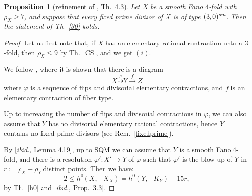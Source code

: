 \documentclass[a4paper,12pt]{amsart}
\newtheorem{proposition}[thm]{Proposition}
\theoremstyle{definition}
\numberwithin{figure}{section}
\numberwithin{table}{section}
\newcommand{\ph}{\varphi}
\newcommand{\la}{\longrightarrow}
\newcommand{\sm}{\text{\it sm}}
\begin{document}
\begin{proposition}[refinement of \cite{blowup}, Th.~4.3]\label{all30}
  Let $X$ be a smooth Fano $4$-fold with $\rho_X\geq 7$, and suppose that every fixed prime divisor of $X$ is of type $(3,0)^{\sm}$. Then the statement of Th.~\ref{30} holds.
  \end{proposition}
  \begin{proof}
    Let us first note that, if $X$ has an elementary rational contraction onto a $3$-fold, then $\rho_X\leq 9$ by Th.~\ref{CS}, and we get $(i)$.

    We follow  \cite[proof of Lemma 4.22]{blowup}, where it is shown that there is a diagram
    $$X\stackrel{\ph}{\dasharrow} Y\stackrel{f}{\la} Z$$
    where $\ph$ is a sequence of flips and divisorial elementary  contractions, and $f$ is an elementary contraction of fiber type.

    Up to increasing the number of flips and divisorial contractions in $\ph$, we can also assume that $Y$ has no divisorial elementary  rational contractions, hence $Y$ contains no fixed prime divisors (see Rem.~\ref{fixedprime}). 

    By [\emph{ibid.}, Lemma 4.19], up to SQM we can assume that   $Y$ is a smooth Fano $4$-fold, and  there is a resolution
    $\ph'\colon X'\to Y$
    of $\ph$ such that $\ph'$ 
 is  the blow-up of $Y$ in $r:=\rho_X-\rho_Y$ distinct points. Then we have:
    \begin{equation}\label{sections}
     2\leq h^0(X,-K_X)=h^0(Y,-K_Y)-15r,
   \end{equation}
   by Th.~\ref{h0} and [\emph{ibid.}, Prop.~3.3].


\end{proof}
\end{document}
